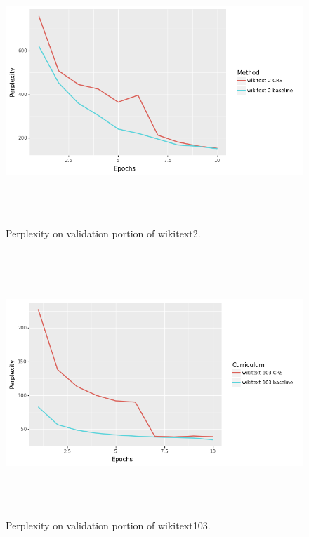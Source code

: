 \begin{figure}[h]
\centering
\includegraphics[height=10cm]{Thesis/images/wikitext-2BS.png}
\caption{Perplexity on validation portion of wikitext2.}
\label{fig:cs-perp-2}
\end{figure}
\begin{figure}[h]
\centering
\includegraphics[height=10cm]{Thesis/images/wikitext-103BS.png}
\caption{Perplexity on validation portion of wikitext103.}
\label{fig:cs-perp-103}
\end{figure}
